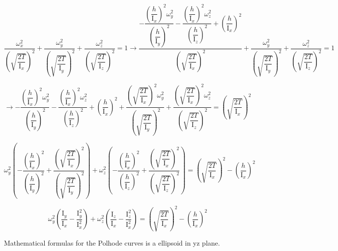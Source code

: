 \begin{equation}
    \dfrac{\omega_x^2}{\left(\sqrt{\dfrac{2T}{\mathrm{I}_x}}\right)^2} +
    \dfrac{\omega_y^2}{\left(\sqrt{\dfrac{2T}{\mathrm{I}_y}}\right)^2} +
    \dfrac{\omega_z^2}{\left(\sqrt{\dfrac{2T}{\mathrm{I}_z}}\right)^2} = 1 \to     \dfrac{-\dfrac{\left(\dfrac{h}{\mathrm{I}_x}\right)^2\omega_y^2}{\left(\dfrac{h}{\mathrm{I}_y}\right)^2} -
    \dfrac{\left(\dfrac{h}{\mathrm{I}_x}\right)^2\omega_z^2}{\left(\dfrac{h}{\mathrm{I}_z}\right)^2} + \left(\dfrac{h}{\mathrm{I}_x}\right)^2}{\left(\sqrt{\dfrac{2T}{\mathrm{I}_x}}\right)^2} +
    \dfrac{\omega_y^2}{\left(\sqrt{\dfrac{2T}{\mathrm{I}_y}}\right)^2} +
    \dfrac{\omega_z^2}{\left(\sqrt{\dfrac{2T}{\mathrm{I}_z}}\right)^2} = 1
\end{equation}

\begin{equation}
    \to -\dfrac{\left(\dfrac{h}{\mathrm{I}_x}\right)^2\omega_y^2}{\left(\dfrac{h}{\mathrm{I}_y}\right)^2} -
    \dfrac{\left(\dfrac{h}{\mathrm{I}_x}\right)^2\omega_z^2}{\left(\dfrac{h}{\mathrm{I}_z}\right)^2} + \left(\dfrac{h}{\mathrm{I}_x}\right)^2 +
    \dfrac{\left(\sqrt{\dfrac{2T}{\mathrm{I}_x}}\right)^2\omega_y^2}{\left(\sqrt{\dfrac{2T}{\mathrm{I}_y}}\right)^2} +
    \dfrac{\left(\sqrt{\dfrac{2T}{\mathrm{I}_x}}\right)^2\omega_z^2}{\left(\sqrt{\dfrac{2T}{\mathrm{I}_z}}\right)^2} =\left(\sqrt{\dfrac{2T}{\mathrm{I}_x}}\right)^2
\end{equation}

\begin{equation}
    \omega^2_y \left(-\dfrac{\left(\dfrac{h}{\mathrm{I}_x}\right)^2}{\left(\dfrac{h}{\mathrm{I}_y}\right)^2}+\dfrac{\left(\sqrt{\dfrac{2T}{\mathrm{I}_x}}\right)^2}{\left(\sqrt{\dfrac{2T}{\mathrm{I}_y}}\right)^2} \right) + \omega_z^2\left(-\dfrac{\left(\dfrac{h}{\mathrm{I}_x}\right)^2}{\left(\dfrac{h}{\mathrm{I}_z}\right)^2}+\dfrac{\left(\sqrt{\dfrac{2T}{\mathrm{I}_x}}\right)^2}{\left(\sqrt{\dfrac{2T}{\mathrm{I}_z}}\right)^2} \right) = \left(\sqrt{\dfrac{2T}{\mathrm{I}_x}}\right)^2 - \left(\dfrac{h}{\mathrm{I}_x}\right)^2
\end{equation}

\begin{equation}
    \omega_y^2\left(\dfrac{\mathrm{I}_y}{\mathrm{I}_x} - \dfrac{\mathrm{I}_y^2}{\mathrm{I}_x^2} \right) +
    \omega_z^2\left(\dfrac{\mathrm{I}_z}{\mathrm{I}_x} - \dfrac{\mathrm{I}_z^2}{\mathrm{I}_x^2} \right) = \left(\sqrt{\dfrac{2T}{\mathrm{I}_x}}\right)^2 - \left(\dfrac{h}{\mathrm{I}_x}\right)^2
\end{equation}

Mathematical formulas for the Polhode curves is a ellipsoid in yz plane.